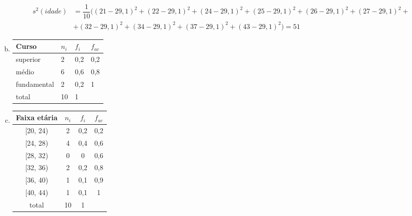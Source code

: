 \documentclass{article}
\begin{document}
\begin{enumerate}[a)]
{\tiny\begin{align*}
    s^2(idade)&=\dfrac{1}{10}((21-29,1)^2 + (22-29,1)^2 + (24 - 29,1)^2 +(25-29,1)^2 + (26-29,1)^2 + (27-29,1)^2+\\
    &+ (32-29,1)^2 + (34-29,1)^2 + (37-29,1)^2 + (43-29,1)^2) = 51
\end{align*}}

\item 

\begin{table}[ht]
\centering
\begin{tabular}{llll}
\hline
Curso       & $n_i$ & $f_i$ & $f_{ac}$ \\ \hline
superior    & 2     & 0,2   & 0,2      \\
médio       & 6     & 0,6   & 0,8      \\
fundamental & 2     & 0,2   & 1        \\
total       & 10    & 1     &          \\ \hline
\end{tabular}
\end{table}

\item 

\begin{table}[ht]
\centering
\begin{tabular}{cccc}
\hline
Faixa etária & $n_i$ & $f_i$ & $f_{ac}$ \\ \hline
{[}20, 24)   & 2     & 0,2   & 0,2      \\
{[}24, 28)   & 4     & 0,4   & 0,6      \\
{[}28, 32)   & 0     & 0     & 0,6      \\
{[}32, 36)   & 2     & 0,2   & 0,8      \\
{[}36, 40)   & 1     & 0,1   & 0,9      \\
{[}40, 44)   & 1     & 0,1   & 1        \\
total        & 10    & 1     &          \\ \hline
\end{tabular}
\end{table}
\end{enumerate}
\end{document}
